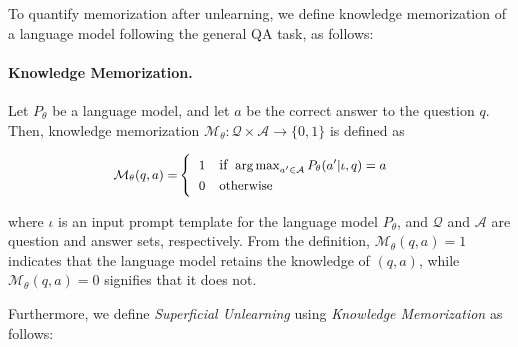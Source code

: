To quantify memorization after unlearning, we define knowledge memorization of a language model following the general QA task, as follows:

\paragraph{Knowledge Memorization.}
\label{def:knoweldge_mem}
Let $P_{\theta}$ be a language model, and let $a$ be the correct answer to the question $q$. Then, knowledge memorization $\mathcal{M}_{\theta}: \mathcal{Q} \times \mathcal{A} \rightarrow \{0, 1\}$ is defined as



\begin{equation}
\begin{aligned}
    \text{\small $\mathcal{M}_{\theta}(q,a) =$} \begin{cases}\:\ \text{\small $1$} & \text{if} \:\ \text{\small $\argmax_{a'\in \mathcal{A}} P_{\theta}(a'|\iota, q) = a$}\:\:\:\:\ \\
    \:\ \text{\small $0$} & \text{\small otherwise}
    \end{cases}
\end{aligned}
\label{def:memory}
\end{equation}


\noindent where $\iota$ is an input prompt template for the language model $P_{\theta}$, and $\mathcal{Q}$ and $\mathcal{A}$ are question and answer sets, respectively.
From the definition, $\mathcal{M}_{\theta}(q,a)=1$ indicates that the language model retains the knowledge of $(q,a)$, while $\mathcal{M}_{\theta}(q,a)=0$ signifies that it does not.

Furthermore, we define \textit{Superficial Unlearning} using \textit{Knowledge Memorization} as follows:





